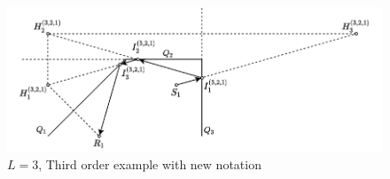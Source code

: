 \begin{figure}[H]
    \begin{center}
    \includegraphics[width=\textwidth]{figures/approach/figHigherOrder.pdf}
    \end{center}
    \caption[$L=3$, Third order example with new notation]{$L=3$, Third order example with new notation}
    \label{fig:higherOrder}
\end{figure}
